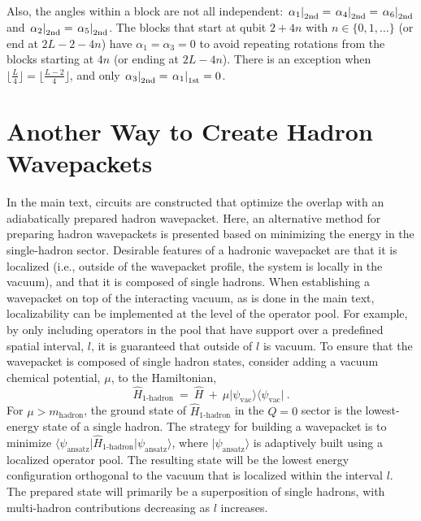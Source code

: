 \documentclass[aps, prc, tightenlines,superscriptaddress, letterpaper, amsmath, amssymb, preprintnumbers, floatfix, longbibliography, nofootinbib]{revtex4-2}
\begin{document}
Also, the angles within a block are not all independent:  $\left. \alpha_1 \right|_{2{\rm nd}} = \left. \alpha_4 \right|_{2{\rm nd}} = \left. \alpha_6 \right|_{2{\rm nd}}$ and $\left. \alpha_2 \right|_{2{\rm nd}} = \left. \alpha_5 \right|_{2{\rm nd}}$. 
The blocks that start at qubit  
$2+4n$ with $n\in\{0,1,\ldots\}$ (or end at $2L-2-4n$) have  
$\alpha_1=\alpha_3=0$ to avoid repeating rotations from the blocks starting at $4n$ (or ending at $2L-4n$). 
There is an exception when $\lfloor\frac{L}{4}\rfloor=\lfloor\frac{L-2}{4}\rfloor$, and only $\left. \alpha_3 \right|_{2{\rm nd}}=\left. \alpha_1 \right|_{1{\rm st}}=0$.




\section{Another Way to Create Hadron Wavepackets}
\label{app:chempot}
\noindent
In the main text, circuits are constructed that optimize the overlap with an adiabatically prepared hadron wavepacket.
Here, an alternative method for preparing hadron wavepackets is presented based on minimizing the energy in the single-hadron sector.
Desirable features of a hadronic wavepacket are that it is localized (i.e., outside of the wavepacket profile, the system is locally in the vacuum), and that it is composed of single hadrons.
When establishing a wavepacket on top of the interacting vacuum, as is done in the main text, localizability can be implemented at the level of the operator pool.
For example, by only including operators in the pool that have support over a predefined spatial interval, $l$, it is guaranteed that outside of $l$ is vacuum.
To ensure that the wavepacket is composed of single hadron states, consider adding a vacuum chemical potential, $\mu$, to the Hamiltonian,
%
\begin{equation}
\hat{H}_{\text{1-hadron}} \ = \ \hat{H} \ + \ \mu \vert \psi_{\text{vac}} \rangle \langle \psi_{\text{vac}}\vert \ .
\label{eq:H1chem}
\end{equation}
%
For $\mu > m_{\text{hadron}}$, the ground state of $\hat{H}_{\text{1-hadron}}$ 
in the $Q=0$ sector is the lowest-energy state of a single hadron.
The strategy for building a wavepacket is to minimize $\langle \psi_{\text{ansatz}} \vert \hat{H}_{\text{1-hadron}}\vert  \psi_{\text{ansatz}} \rangle$, where $\vert  \psi_{\text{ansatz}} \rangle$ is adaptively built using a localized operator pool. 
The resulting state will be the lowest energy configuration orthogonal to the vacuum that is localized within the interval $l$. 
The prepared state will primarily be a superposition of single hadrons, with multi-hadron contributions decreasing as $l$ increases.
\end{document}
